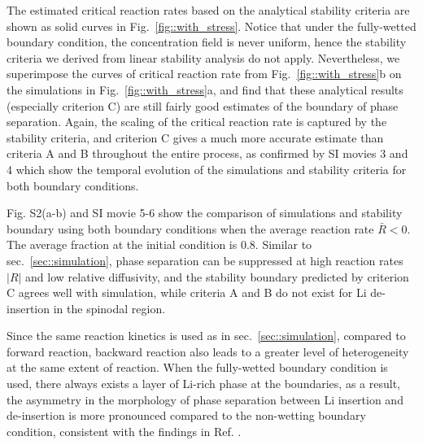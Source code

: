 \documentclass[reprint,aps,pre,superscriptaddress]{revtex4-2}
\begin{document}
The estimated critical reaction rates based on the analytical stability criteria are shown as solid curves in Fig.~\ref{fig::with_stress}. Notice that under the fully-wetted boundary condition, the concentration field is never uniform, hence the stability criteria we derived from linear stability analysis do not apply. Nevertheless, we superimpose the curves of critical reaction rate from Fig.~\ref{fig::with_stress}b on the simulations in Fig.~\ref{fig::with_stress}a, and find that these analytical results (especially criterion C) are still fairly good estimates of the boundary of phase separation.
Again, the scaling of the critical reaction rate is captured by the stability criteria, and criterion C gives a much more accurate estimate than criteria A and B throughout the entire process, as confirmed by SI movies 3 and 4 which show the temporal evolution of the simulations and stability criteria for both boundary conditions.

Fig. S2(a-b) and SI movie 5-6 show the comparison of simulations and stability boundary using both boundary conditions when the average reaction rate $\bar{R}<0$. The average fraction at the initial condition is 0.8. Similar to sec.~\ref{sec::simulation}, phase separation can be suppressed at high reaction rates $|R|$ and low relative diffusivity, and the stability boundary predicted by criterion C agrees well with simulation, while criteria A and B do not exist for Li de-insertion in the spinodal region.

Since the same reaction kinetics is used as in sec.~\ref{sec::simulation}, compared to forward reaction, backward reaction also leads to a greater level of heterogeneity at the same extent of reaction. 
When the fully-wetted boundary condition is used, there always exists a layer of Li-rich phase at the boundaries, as a result, the asymmetry in the morphology of phase separation between Li insertion and de-insertion is more pronounced compared to the non-wetting boundary condition, consistent with the findings in Ref. \cite{Cogswell2018a}.

\end{document}
